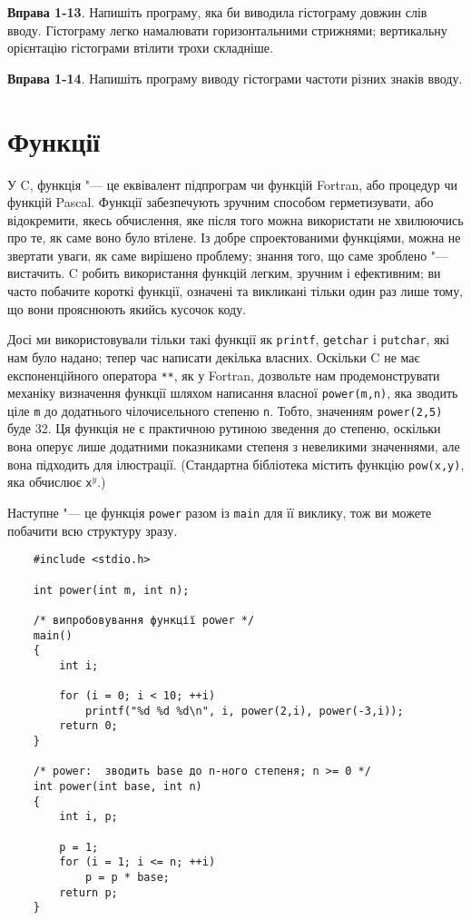 \documentclass[a4paper,12pt]{book}
\begin{document}
  \textbf{Вправа 1-13}. Напишіть програму, яка би виводила гістограму довжин слів вводу.
  Гістограму легко намалювати горизонтальними стрижнями; вертикальну орієнтацію гістограми
  втілити трохи складніше.

  \textbf{Вправа 1-14}. Напишіть програму виводу гістограми частоти різних знаків вводу.

\section{Функції}


  У C, функція "--- це еквівалент підпрограм чи функцій Fortran, або процедур чи
  функцій Pascal. Функції забезпечують зручним способом герметизувати, або відокремити,
  якесь обчислення, яке після того можна використати не хвилюючись про те, як саме воно
  було втілене. Із добре спроектованими функціями, можна не звертати уваги, як саме
  вирішено проблему; знання того, що саме зроблено "--- вистачить. C робить
  використання функцій легким, зручним і ефективним; ви часто побачите короткі функції,
  означені та викликані тільки один раз лише тому, що вони прояснюють якийсь кусочок коду.

  Досі ми використовували тільки такі функції як \texttt{printf}, \texttt{getchar} і
  \texttt{putchar}, які нам було надано; тепер час написати декілька власних. Оскільки C
  не має експоненційного оператора \texttt{**}, як у Fortran, дозвольте нам
  продемонструвати механіку визначення функції шляхом написання власної
  \texttt{power(m,n)}, яка зводить ціле \texttt{m} до додатнього чілочисельного степеню
  \texttt{n}. Тобто, значенням \texttt{power(2,5)} буде 32. Ця функція не є практичною
  рутиною зведення до степеню, оскільки вона оперує лише додатними показниками степеня з
  невеликими значеннями, але вона підходить для ілюстрації. (Стандартна бібліотека містить
  функцію \texttt{pow(x,y)}, яка обчислює \texttt{x\(^{y}\)}.)

  Наступне "--- це функція \texttt{power} разом із \texttt{main} для її виклику, тож ви
  можете побачити всю структуру зразу.

  \begin{verbatim}
    #include <stdio.h>

    int power(int m, int n);

    /* випробовування функції power */
    main()
    {
        int i;

        for (i = 0; i < 10; ++i)
            printf("%d %d %d\n", i, power(2,i), power(-3,i));
        return 0;
    }

    /* power:  зводить base до n-ного степеня; n >= 0 */
    int power(int base, int n)
    {
        int i, p;

        p = 1;
        for (i = 1; i <= n; ++i)
            p = p * base;
        return p;
    }
  \end{verbatim}
\end{document}
